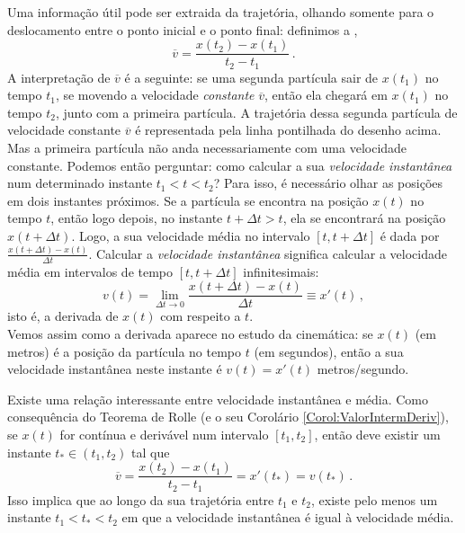 Uma informação útil pode ser extraida da trajetória, 
olhando somente para o deslocamento entre o ponto inicial e o ponto final:
definimos a , 
$$
\overline{v}=\frac{x(t_2)-x(t_1)}{t_2-t_1}\,.
$$ 
A interpretação de $\overline{v}$ é a seguinte: se uma segunda partícula sair de
$x(t_1)$ no tempo $t_1$, se movendo a velocidade \emph{constante}
$\overline{v}$, então ela chegará em $x(t_1)$ no tempo $t_2$, junto com a
primeira partícula. A trajetória dessa segunda partícula de velocidade
constante $\overline{v}$ é representada pela linha pontilhada do desenho
acima.\\

Mas a primeira partícula não anda necessariamente com uma velocidade
constante. Podemos então perguntar: como calcular a sua \emph{velocidade
instantânea} 
num determinado instante $t_1<t<t_2$? 
Para isso, é necessário olhar as posições em dois instantes próximos. Se
a partícula se
encontra na posição $x(t)$ no tempo $t$, então logo depois, no instante
$t+\Delta t>t$, ela se encontrará na posição $x(t+\Delta t)$. Logo, a sua
velocidade média no intervalo $[t,t+\Delta t]$ é dada por $\frac{x(t+\Delta
t)-x(t)}{\Delta t}$. Calcular a \emph{velocidade instantânea} significa
calcular a velocidade média em intervalos de tempo $[t,t+\Delta t]$
infinitesimais:
$$v(t)=\lim_{\Delta t\to 0}\frac{x(t+\Delta
t)-x(t)}{\Delta t}\equiv x'(t)\,, $$
isto é, a derivada de $x(t)$ com respeito a $t$.\\

Vemos assim como a derivada aparece no estudo da cinemática: se $x(t)$
(em metros) é a posição da partícula no tempo $t$ (em
segundos), então a sua velocidade instantânea neste instante é $v(t)=x'(t)$
metros/segundo. 

\begin{obs}
Existe uma relação interessante entre 
velocidade instantânea e média. 
Como consequência do Teorema de Rolle
(e o seu Corolário \ref{Corol:ValorIntermDeriv}), se $x(t)$ for contínua
e derivável num intervalo $[t_1,t_2]$, então deve existir um instante
$t_*\in (t_1,t_2)$ tal que
\[\overline{v}=
\frac{x(t_2)-x(t_1)}{t_2-t_1}=x'(t_*)=v(t_*)\,.
\]
Isso implica que ao longo da sua trajetória entre $t_1$ e $t_2$, existe
pelo menos um instante $t_1<t_*<t_2$ em que a velocidade instantânea é igual à
velocidade média.
\end{obs}


